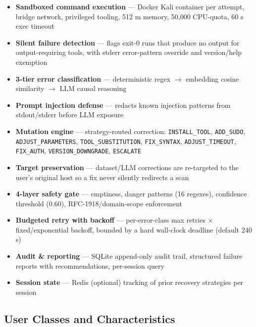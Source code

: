 \documentclass[10pt,journal,onecolumn]{IEEEtran}
\begin{document}
\begin{itemize}
\item \textbf{Sandboxed command execution} --- Docker Kali container per attempt, bridge network, privileged tooling, 512 m memory, 50,000 CPU-quota, 60 s exec timeout
\item \textbf{Silent failure detection} --- flags exit-0 runs that produce no output for output-requiring tools, with stderr error-pattern override and version/help exemption
\item \textbf{3-tier error classification} --- deterministic regex $\rightarrow$ embedding cosine similarity $\rightarrow$ LLM causal reasoning
\item \textbf{Prompt injection defense} --- redacts known injection patterns from stdout/stderr before LLM exposure
\item \textbf{Mutation engine} --- strategy-routed correction: \texttt{INSTALL\_TOOL}, \texttt{ADD\_SUDO}, \texttt{ADJUST\_PARAMETERS}, \texttt{TOOL\_SUBSTITUTION}, \texttt{FIX\_SYNTAX}, \texttt{ADJUST\_TIMEOUT}, \texttt{FIX\_AUTH}, \texttt{VERSION\_DOWNGRADE}, \texttt{ESCALATE}
\item \textbf{Target preservation} --- dataset/LLM corrections are re-targeted to the user's original host so a fix never silently redirects a scan
\item \textbf{4-layer safety gate} --- emptiness, danger patterns (16 regexes), confidence threshold (0.60), RFC-1918/domain-scope enforcement
\item \textbf{Budgeted retry with backoff} --- per-error-class max retries × fixed/exponential backoff, bounded by a hard wall-clock deadline (default 240 s)
\item \textbf{Audit \& reporting} --- SQLite append-only audit trail, structured failure reports with recommendations, per-session query
\item \textbf{Session state} --- Redis (optional) tracking of prior recovery strategies per session
\end{itemize}

\subsection{User Classes and Characteristics}
\end{document}
